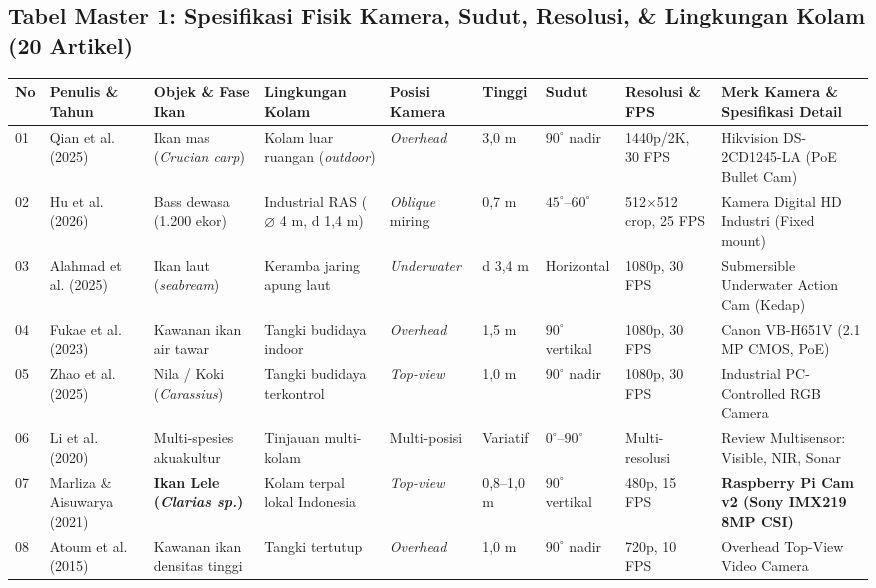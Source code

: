 \documentclass[10pt,a4paper]{article}
\begin{document}
\subsection{Tabel Master 1: Spesifikasi Fisik Kamera, Sudut, Resolusi, \& Lingkungan Kolam (20 Artikel)}
{\scriptsize
\setlength{\tabcolsep}{2pt}
\begin{longtable}{@{}p{0.35cm} p{2.5cm} p{2.2cm} p{2.0cm} p{1.3cm} p{0.75cm} p{1.05cm} p{2.0cm} p{3.8cm}@{}}
\toprule
\textbf{No} & \textbf{Penulis \& Tahun} & \textbf{Objek \& Fase Ikan} & \textbf{Lingkungan Kolam} & \textbf{Posisi Kamera} & \textbf{Tinggi} & \textbf{Sudut} & \textbf{Resolusi \& FPS} & \textbf{Merk Kamera \& Spesifikasi Detail} \\
\midrule
\endhead
01 & Qian et al. (2025) & Ikan mas (\textit{Crucian carp}) & Kolam luar ruangan (\textit{outdoor}) & \textit{Overhead} & 3,0 m & $90^\circ$ nadir & 1440p/2K, 30 FPS & Hikvision DS-2CD1245-LA (PoE Bullet Cam) \\
02 & Hu et al. (2026) & Bass dewasa (1.200 ekor) & Industrial RAS ($\varnothing$ 4 m, d 1,4 m) & \textit{Oblique} miring & 0,7 m & $45^\circ\text{--}60^\circ$ & 512$\times$512 crop, 25 FPS & Kamera Digital HD Industri (Fixed mount) \\
03 & Alahmad et al. (2025) & Ikan laut (\textit{seabream}) & Keramba jaring apung laut & \textit{Underwater} & d 3,4 m & Horizontal & 1080p, 30 FPS & Submersible Underwater Action Cam (Kedap) \\
04 & Fukae et al. (2023) & Kawanan ikan air tawar & Tangki budidaya indoor & \textit{Overhead} & 1,5 m & $90^\circ$ vertikal & 1080p, 30 FPS & Canon VB-H651V (2.1 MP CMOS, PoE) \\
05 & Zhao et al. (2025) & Nila / Koki (\textit{Carassius}) & Tangki budidaya terkontrol & \textit{Top-view} & 1,0 m & $90^\circ$ nadir & 1080p, 30 FPS & Industrial PC-Controlled RGB Camera \\
06 & Li et al. (2020) & Multi-spesies akuakultur & Tinjauan multi-kolam & Multi-posisi & Variatif & $0^\circ\text{--}90^\circ$ & Multi-resolusi & Review Multisensor: Visible, NIR, Sonar \\
07 & Marliza \& Aisuwarya (2021) & \textbf{Ikan Lele (\textit{Clarias sp.})} & Kolam terpal lokal Indonesia & \textit{Top-view} & 0,8--1,0 m & $90^\circ$ vertikal & 480p, 15 FPS & \textbf{Raspberry Pi Cam v2 (Sony IMX219 8MP CSI)} \\
08 & Atoum et al. (2015) & Kawanan ikan densitas tinggi & Tangki tertutup & \textit{Overhead} & 1,0 m & $90^\circ$ nadir & 720p, 10 FPS & Overhead Top-View Video Camera \\

\end{longtable}}
\end{document}
